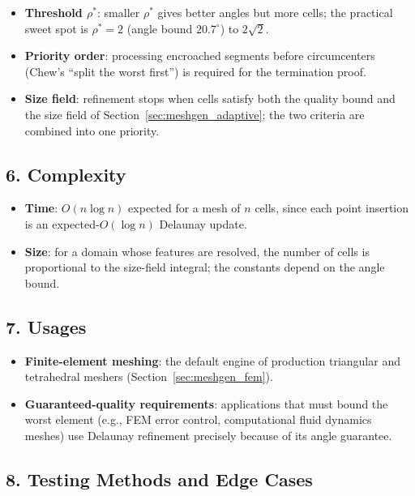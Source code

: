 \begin{itemize}
\item \textbf{Threshold $\rho^*$}: smaller $\rho^*$ gives better angles but
  more cells; the practical sweet spot is $\rho^* = 2$ (angle bound
  $20.7^\circ$) to $2\sqrt{2}$.
\item \textbf{Priority order}: processing encroached segments before
  circumcenters (Chew's ``split the worst first'') is required for the
  termination proof.
\item \textbf{Size field}: refinement stops when cells satisfy both the
  quality bound and the size field of Section~\ref{sec:meshgen_adaptive};
  the two criteria are combined into one priority.
\end{itemize}

\subsection{6. Complexity}

\begin{itemize}
\item \textbf{Time}: $O(n \log n)$ expected for a mesh of $n$ cells, since
  each point insertion is an expected-$O(\log n)$ Delaunay update.
\item \textbf{Size}: for a domain whose features are resolved, the number
  of cells is proportional to the size-field integral; the constants depend
  on the angle bound.
\end{itemize}

\subsection{7. Usages}

\begin{itemize}
\item \textbf{Finite-element meshing}: the default engine of production
  triangular and tetrahedral meshers (Section~\ref{sec:meshgen_fem}).
\item \textbf{Guaranteed-quality requirements}: applications that must bound
  the worst element (e.g., FEM error control, computational fluid dynamics
  meshes) use Delaunay refinement precisely because of its angle guarantee.
\end{itemize}

\subsection{8. Testing Methods and Edge Cases}

